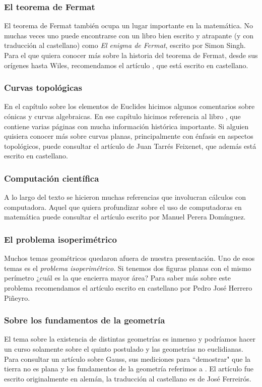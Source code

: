 \subsubsection*{El teorema de Fermat}

El teorema de Fermat también ocupa un lugar importante en 
la matemática. No muchas veces uno puede encontrarse
con un libro bien escrito y atrapante (y con traducción al castellano) 
como \emph{El enigma de Fermat}, escrito por Simon Singh. Para
el que quiera conocer más sobre la historia del teorema
de Fermat, desde sus orígenes hasta Wiles, 
recomendamos el artículo \cite{corry_fermat}, que está escrito en castellano.  

\subsubsection*{Curvas topológicas}

En el capítulo sobre los elementos de Euclides hicimos algunos
comentarios sobre cónicas y curvas algebraicas. En ese capítulo 
hicimos referencia al libro \cite{MR2975988}, que contiene
varias páginas con mucha información histórica importante. Si alguien 
quisiera conocer más sobre curvas planas, principalmente con énfasis 
en aspectos topológicos, 
puede consultar el artículo \cite{tf_curvas} de Juan Tarrés Feixenet, 
que además está escrito en castellano. 

\subsubsection*{Computación científica}

A lo largo del texto se hicieron muchas referencias que involucran cálculos
con computadora. Aquel que quiera profundizar sobre 
el uso de computadoras en matemática puede consultar
el artículo \cite{pd_ENIAC} escrito por Manuel Perera Domínguez. 

\subsubsection*{El problema isoperimétrico}

Muchos temas geométricos quedaron afuera de nuestra presentación. Uno de esos
temas es el \emph{problema isoperimétrico}. Si tenemos dos figuras planas
con el mismo perímetro ¿cuál es la que encierra mayor área? Para 
saber más sobre este problema 
recomendamos el artículo \cite{hp_isoperimetric} 
escrito en castellano por Pedro Jos{\'e} Herrero Pi{\~n}eyro. 

\subsubsection*{Sobre los fundamentos de la geometría}

El tema sobre la existencia de distintas geometrías es inmenso y podríamos
hacer un curso solamente sobre el quinto postulado y las geometrías no euclidianas. 
Para consultar un 
artículo sobre Gauss, sus mediciones para ``demostrar" que la tierra
no es plana y los fundamentos de la geometría
referimos a \cite{scholz_triangulos}. El artículo fue escrito originalmente 
en alemán, la traducción al castellano
es de José Ferreirós.